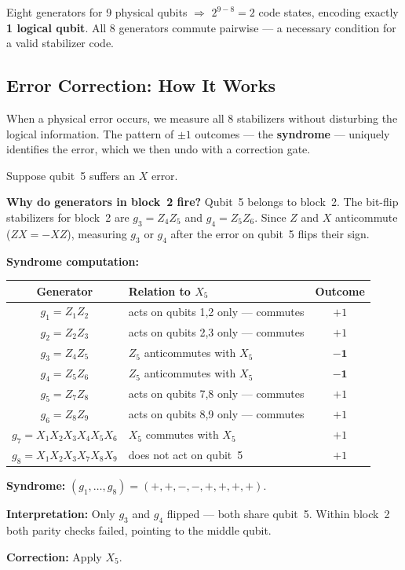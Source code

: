 \documentclass[11pt, a4paper]{article}
\theoremstyle{definition}
\theoremstyle{plain}
\theoremstyle{remark}
\begin{document}
\begin{keypoint}
Eight generators for 9 physical qubits $\Rightarrow$ $2^{9-8} = 2$
code states, encoding exactly \textbf{1 logical qubit}.
All 8 generators commute pairwise --- a necessary condition for a valid
stabilizer code.
\end{keypoint}

\subsection{Error Correction: How It Works}

When a physical error occurs, we measure all 8 stabilizers without
disturbing the logical information.  The pattern of $\pm 1$ outcomes ---
the \textbf{syndrome} --- uniquely identifies the error, which we then undo
with a correction gate.

\begin{workedexample}
Suppose qubit~5 suffers an $X$ error.

\medskip\noindent
\textbf{Why do generators in block~2 fire?}
Qubit~5 belongs to block~2.  The bit-flip stabilizers for block~2 are
$g_3 = Z_4 Z_5$ and $g_4 = Z_5 Z_6$.  Since $Z$ and $X$ anticommute
($ZX = -XZ$), measuring $g_3$ or $g_4$ after the error on qubit~5
flips their sign.

\medskip\noindent
\textbf{Syndrome computation:}
\begin{center}
\renewcommand{\arraystretch}{1.4}
\begin{tabular}{clc}
\hline
Generator & Relation to $X_5$ & Outcome \\
\hline
$g_1 = Z_1 Z_2$ & acts on qubits 1,2 only --- commutes & $+1$ \\
$g_2 = Z_2 Z_3$ & acts on qubits 2,3 only --- commutes & $+1$ \\
$g_3 = Z_4 Z_5$ & $Z_5$ anticommutes with $X_5$ & $\mathbf{-1}$ \\
$g_4 = Z_5 Z_6$ & $Z_5$ anticommutes with $X_5$ & $\mathbf{-1}$ \\
$g_5 = Z_7 Z_8$ & acts on qubits 7,8 only --- commutes & $+1$ \\
$g_6 = Z_8 Z_9$ & acts on qubits 8,9 only --- commutes & $+1$ \\
$g_7 = X_1 X_2 X_3 X_4 X_5 X_6$ & $X_5$ commutes with $X_5$ & $+1$ \\
$g_8 = X_1 X_2 X_3 X_7 X_8 X_9$ & does not act on qubit~5 & $+1$ \\
\hline
\end{tabular}
\end{center}

\medskip\noindent
\textbf{Syndrome:} $(g_1,\ldots,g_8) = (+,+,-,-,+,+,+,+)$.

\medskip\noindent
\textbf{Interpretation:} Only $g_3$ and $g_4$ flipped --- both share
qubit~5.  Within block~2 both parity checks failed, pointing to the
middle qubit.

\medskip\noindent
\textbf{Correction:} Apply $X_5$.
\end{workedexample}
\end{document}
